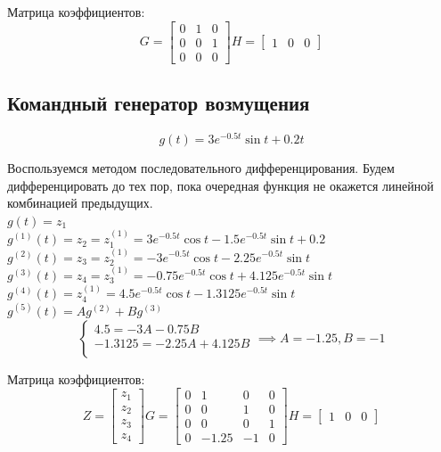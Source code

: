 \documentclass[12pt, a4paper] {ncc}
\begin{document}
		Матрица коэффициентов:
		\[G = 
			\begin{bmatrix}
				0 & 1 & 0 \\
				0 & 0 & 1 \\
				0 & 0 & 0
			\end{bmatrix}
			H = \begin{bmatrix}
					1 & 0 & 0
				\end{bmatrix}
		\]
		
	\subsection{Командный генератор возмущения}

		\[g(t) = 3 e^{-0.5t}\sin t + 0.2 t\]


	Воспользуемся методом последовательного дифференцирования. Будем дифференцировать до тех
	пор, пока очередная функция не окажется линейной комбинацией предыдущих.\\
		$g(t) = z_1$ \\
		$g^{(1)}(t) = z_2 = z^{(1)}_1 = 3  e^{-0.5t} \cos t - 1.5 e^{-0.5t} \sin t + 0.2$ \\
		$g^{(2)}(t) = z_3 = z^{(1)}_2 = -3e^{-0.5t}\cos t - 2.25e^{-0.5t}\sin t$ \\
		$g^{(3)}(t) = z_4 = z^{(1)}_3 = -0.75e^{-0.5t}\cos t + 4.125e^{-0.5t}\sin t$ \\
		$g^{(4)}(t) = z^{(1)}_4 = 4.5e^{-0.5t}\cos t - 1.3125e^{-0.5t}\sin t$ \\
		$g^{(5)}(t) = Ag^{(2)} + Bg^{(3)} $ \\

	\[
		\begin{cases}
			4.5 = -3 A - 0.75 B\\
			-1.3125 = -2.25 A + 4.125 B\\
		\end{cases}
		\implies
		A = -1.25, B = -1
	\]


		Матрица коэффициентов:
		\[
			Z = \begin{bmatrix}
				z_1 \\ z_2 \\ z_3 \\ z_4
			\end{bmatrix}
			G = 
			\begin{bmatrix}
				0 & 1 & 0 & 0\\
				0 & 0 & 1 & 0 \\
				0 & 0 & 0 & 1 \\
				0 & -1.25 & -1 & 0
			\end{bmatrix}
			H = \begin{bmatrix}
					1 & 0 & 0
				\end{bmatrix}
		\]
\end{document}
